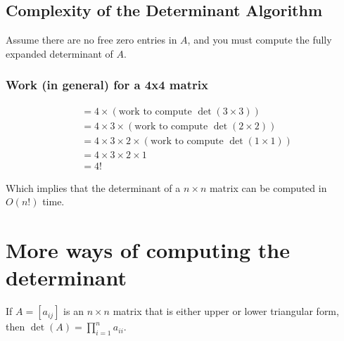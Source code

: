 \subsection{Complexity of the Determinant Algorithm}

Assume there are no free zero entries in $A$, and you must compute the 
fully expanded determinant of $A$.

\subsubsection{Work (in general) for a 4x4 matrix}

\begin{align*}
&= 4 \times (\text{work to compute } \det(3 \times 3)) \\
&= 4 \times 3 \times (\text{work to compute } \det(2 \times 2)) \\
&= 4 \times 3 \times 2 \times (\text{work to compute } \det(1 \times 1)) \\
&= 4 \times 3 \times 2 \times 1 \\
&= \boxed{4!}
\end{align*}

Which implies that the determinant of a $n \times n$ matrix can be computed
in $O(n!)$ time.

\section{More ways of computing the determinant}

If $A=[a_{ij}]$ is an $n\times n$ matrix that is either upper or lower
triangular form, then $\det(A) = \prod_{i=1}^n a_{ii}$.

